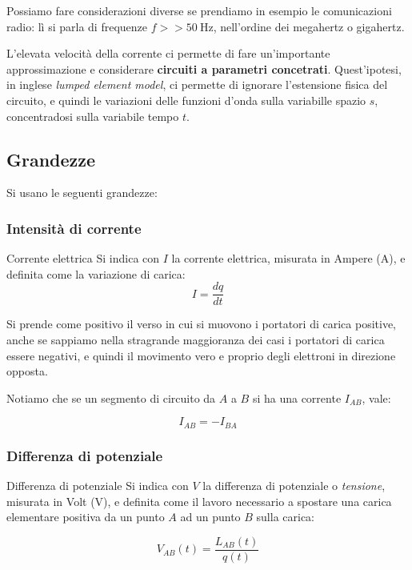 \documentclass[a4paper,11pt]{article}
\begin{document}
Possiamo fare considerazioni diverse se prendiamo in esempio le comunicazioni radio: lì si parla di frequenze $f >> 50 \ \text{Hz}$, nell'ordine dei megahertz o gigahertz.

L'elevata velocità della corrente ci permette di fare un'importante approssimazione e considerare \textbf{circuiti a parametri concetrati}.
Quest'ipotesi, in inglese \textit{lumped element model}, ci permette di ignorare l'estensione fisica del circuito, e quindi le variazioni delle funzioni d'onda sulla variabille spazio $s$, concentradosi sulla variabile tempo $t$.

\subsection{Grandezze}
Si usano le seguenti grandezze:
\subsubsection{Intensità di corrente}

\begin{definition}{Corrente elettrica}	
Si indica con $I$ la corrente elettrica, misurata in Ampere ($\mathrm{A}$), e definita come la variazione di carica:
$$
I = \frac{dq}{dt}
$$
\end{definition}

Si prende come positivo il verso in cui si muovono i portatori di carica positive, anche se sappiamo nella stragrande maggioranza dei casi i portatori di carica essere negativi, e quindi il movimento vero e proprio degli elettroni in direzione opposta.

Notiamo che se un segmento di circuito da $A$ a $B$ si ha una corrente $I_{AB}$, vale:

$$
I_{AB} = -I_{BA}
$$

\subsubsection{Differenza di potenziale}

\begin{definition}{Differenza di potenziale}
Si indica con $V$ la differenza di potenziale o \textit{tensione}, misurata in Volt ($\mathrm{V}$), e definita come il lavoro necessario a spostare una carica elementare positiva da un punto $A$ ad un punto $B$ sulla carica:

$$
	V_{AB}(t) = \frac{L_{AB}(t)}{q(t)}
$$
\end{definition}
\end{document}
